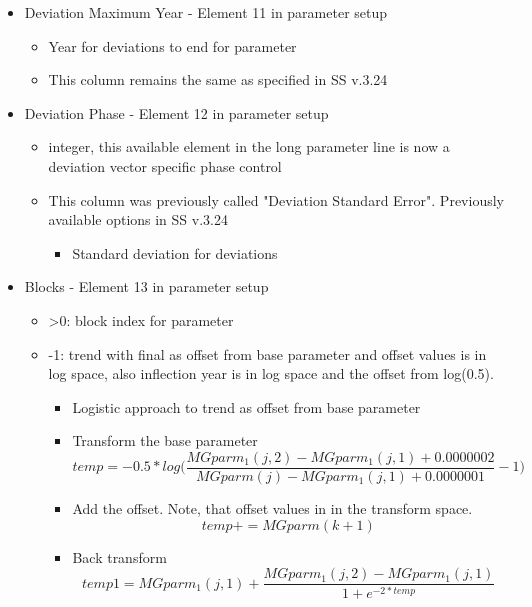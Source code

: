 \begin{itemize}
\begin{itemize}
		\end{itemize}
	\item Deviation  Maximum Year - Element 11 in parameter setup
		\begin{itemize}
			\item Year for deviations to end for parameter
			\item This column remains the same as specified in SS v.3.24
		\end{itemize}
	\item Deviation Phase - Element 12 in parameter setup
		\begin{itemize}
			\item integer, this available element in the long parameter line is now a deviation vector specific phase control
			\item This column was previously called "Deviation Standard Error". Previously available options in SS v.3.24
			\begin{itemize}
				\item Standard deviation for deviations
			\end{itemize}
		\end{itemize}
	\item Blocks - Element 13 in parameter setup
		\begin{itemize}
			\item >0: block index for parameter
			\item -1: trend with final as offset from base parameter and offset values is in log space, also inflection year is in log space and the offset from log(0.5).
			\begin{itemize}
				\item Logistic approach to trend as offset from base parameter
				\item Transform the base parameter
				\begin{equation}
					temp = -0.5*log\Bigg(\frac{MGparm_1(j,2)-MGparm_1(j,1)+0.0000002}{MGparm(j)-MGparm_1(j,1)+0.0000001}-1\Bigg)
				\end{equation}
				\item Add the offset.  Note, that offset values in in the transform space.
				\begin{equation}
					temp += MGparm(k+1)
				\end{equation}
				\item Back transform
				\begin{equation}
					temp1 = MGparm_1(j,1)+\frac{MGparm_1(j,2)-MGparm_1(j,1)}{1+e^{-2*temp}}
				\end{equation}			

\end{itemize}
\end{itemize}
\end{itemize}
